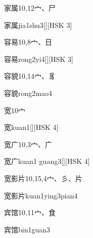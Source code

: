 \begin{entry}{家属}{10,12}{⼧、⼫}
  \begin{phonetics}{家属}{jia1shu3}[][HSK 3]
  \end{phonetics}
\end{entry}

\begin{entry}{容易}{10,8}{⼧、⽇}
  \begin{phonetics}{容易}{rong2yi4}[][HSK 3]
  \end{phonetics}
\end{entry}

\begin{entry}{容貌}{10,14}{⼧、⾘}
  \begin{phonetics}{容貌}{rong2mao4}
  \end{phonetics}
\end{entry}

\begin{entry}{宽}{10}{⼧}
  \begin{phonetics}{宽}{kuan1}[][HSK 4]
  \end{phonetics}
\end{entry}

\begin{entry}{宽广}{10,3}{⼧、⼴}
  \begin{phonetics}{宽广}{kuan1 guang3}[][HSK 4]
  \end{phonetics}
\end{entry}

\begin{entry}{宽影片}{10,15,4}{⼧、⼺、⽚}
  \begin{phonetics}{宽影片}{kuan1ying3pian4}
  \end{phonetics}
\end{entry}

\begin{entry}{宾馆}{10,11}{⼧、⾷}
  \begin{phonetics}{宾馆}{bin1guan3}
  \end{phonetics}
\end{entry}

